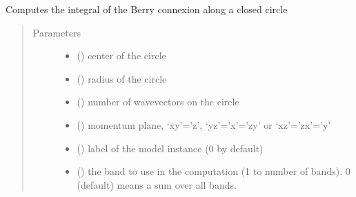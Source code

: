 \documentclass[letterpaper,10pt,english]{sphinxmanual}
\begin{document}
\begin{fulllineitems}
\label{\detokenize{berry:pyqcm.berry.Berry_flux}}
\sphinxAtStartPar
Computes the integral of the Berry connexion along a closed circle
\begin{quote}\begin{description}
\item[{Parameters}] \leavevmode\begin{itemize}
\item {} 
\sphinxAtStartPar
{} () \textendash{} center of the circle

\item {} 
\sphinxAtStartPar
{} () \textendash{} radius of the circle

\item {} 
\sphinxAtStartPar
{} () \textendash{} number of wavevectors on the circle

\item {} 
\sphinxAtStartPar
{} () \textendash{} momentum plane, ‘xy’=’z’, ‘yz’=’x’=’zy’ or ‘xz’=’zx’=’y’

\item {} 
\sphinxAtStartPar
{} () \textendash{} label of the model instance (0 by default)

\item {} 
\sphinxAtStartPar
{} () \textendash{} the band to use in the computation (1 to number of bands). 0 (default) means a sum over all bands.


\end{itemize}
\end{description}
\end{quote}
\end{fulllineitems}
\end{document}
